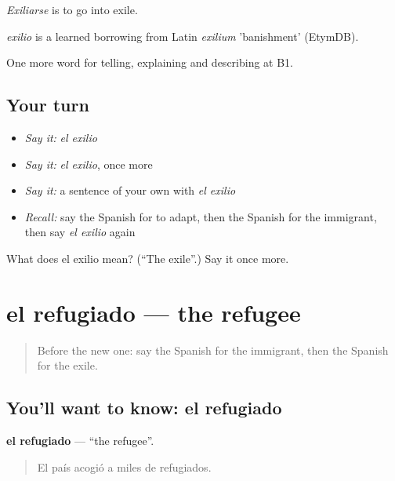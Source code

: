 \emph{Exiliarse} is to go into exile.

\begin{cousinweb}
\emph{exilio} is a learned borrowing from Latin \emph{exilium} 'banishment' (EtymDB).
\end{cousinweb}

\begin{grammarlens}[title={What you've built}]
One more word for telling, explaining and describing at B1.
\end{grammarlens}

\subsection*{Your turn}
\begin{itemize}
\raggedright
  \item \emph{Say it:} \emph{el exilio}
  \item \emph{Say it:} \emph{el exilio}, once more
  \item \emph{Say it:} a sentence of your own with \emph{el exilio}
  \item \emph{Recall:} say the Spanish for to adapt, then the Spanish for the immigrant, then say \emph{el exilio} again
\end{itemize}

\begin{tcolorbox}[breakable,colback=teal!4,colframe=teal!35!black,title={Before you move on}]
What does el exilio mean? (\textquotedblleft{}The exile\textquotedblright{}.) Say it once more.
\end{tcolorbox}
\section[el refugiado]{el refugiado — the refugee}

\label{lesson:ES-C552-refugiado}



\begin{quote}
Before the new one: say the Spanish for the immigrant, then the Spanish for the exile.
\end{quote}

\subsection*{You'll want to know: el refugiado}
\textbf{el refugiado} — \textquotedblleft{}the refugee\textquotedblright{}.

\begin{quote}
El país acogió a miles de refugiados.
\end{quote}

